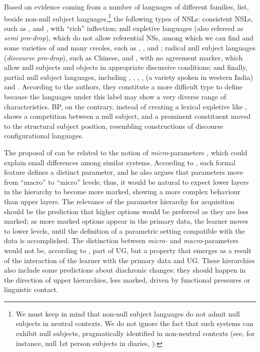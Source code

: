 \documentclass[output=paper]{langsci/langscibook}
\begin{document}
Based on evidence coming from a number of languages of different families,
\citeauthor{RobHol2010} list, beside non-null subject languages,\footnote{We
    must keep in mind that non-null subject languages do not admit null
    subjects in neutral contexts. We do not ignore the fact that such
systems can exhibit null subjects, pragmatically identified in non-neutral
contexts (see, for instance, null 1st person subjects in  diaries,
\citealt{Haegeman1990}).} the following types of \glspl{NSL}: consistent
\glspl{NSL}, such as ,  and , with “rich”
inflection; null expletive languages (also referred as \emph{semi}
\emph{pro-drop}), which do not allow referential NSs, among which we can find
 and some varieties of  and many creoles, such as
, , and ; radical null
subject
languages (\emph{discourse pro-drop}), such as Chinese,  and
, with no agreement marker, which allow null subjects and objects in
appropriate discursive conditions; and finally, partial null subject languages,
including , , , ,
 (a variety spoken in western India) and .  According to the authors, they constitute a more difficult type
to define because the languages under this label may show a very diverse range
of characteristics. \gls{BP}, on the contrary, instead
of creating a lexical expletive like , shows a
competition between a null subject, and a prominent constituent moved to the
structural subject position, resembling constructions of discourse
configurational languages.

The proposal of  can be related to the notion of
\emph{micro}-parameters \citep{Kayne1996}, which could explain small
differences among similar systems. According to \citet{Roberts2012}, each
formal feature defines a distinct parameter, and he also argues that parameters
move from “macro” to “micro” levels; thus, it would be natural to expect lower
layers in the hierarchy to become more marked, showing a more complex behaviour
than upper layers. The relevance of the parameter hierarchy for acquisition
should be the prediction that higher options would be preferred as they are
less marked; as more marked options appear in the primary data, the learner
moves to lower levels, until the definition of a parametric setting compatible
with the data is accomplished. The distinction between \emph{micro-} and
\emph{macro}-parameters would not be, according to \citet[310]{Roberts2012},
part of \gls{UG}, but a property that emerges as a result of the interaction of the
learner with the primary data and \gls{UG}. These hierarchies also include some
predictions about diachronic changes: they should happen in the direction of
upper hierarchies, less marked, driven by functional pressures or linguistic
contact.
\end{document}
